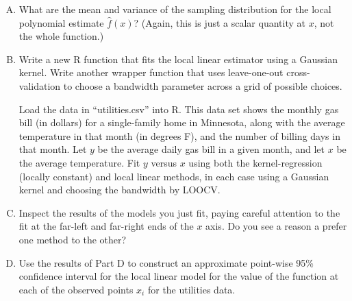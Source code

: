\documentclass{mynotes}
\begin{document}
\begin{enumerate}[(A)]
\item What are the mean and variance of the sampling distribution for the local polynomial estimate $\hat{f}(x)$?  (Again, this is just a scalar quantity at $x$, not the whole function.)

\item Write a new R function that fits the local linear estimator using a Gaussian kernel.  Write another wrapper function that uses leave-one-out cross-validation to choose a bandwidth parameter across a grid of possible choices.

Load the data in ``utilities.csv'' into R.  This data set shows the monthly gas bill (in dollars) for a single-family home in Minnesota, along with the average temperature in that month (in degrees F), and the number of billing days in that month.  Let $y$ be the average daily gas bill in a given month, and let $x$ be the average temperature.  Fit $y$ versus $x$ using both the kernel-regression (locally constant) and local linear methods, in each case using a Gaussian kernel and choosing the bandwidth by LOOCV.

\item Inspect the results of the models you just fit, paying careful attention to the fit at the far-left and far-right ends of the $x$ axis.  Do you see a reason a prefer one method to the other?

\item Use the results of Part D to construct an approximate point-wise 95\% confidence interval for the local linear model for the value of the function at each of the observed points $x_i$ for the utilities data.

\end{enumerate}
\end{document}
